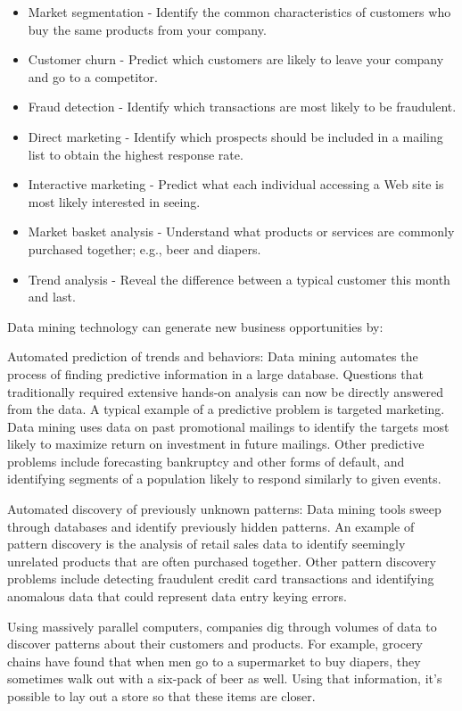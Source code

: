 \documentclass[12pt]{article}
\begin{document}
\begin{itemize}
\item Market segmentation - Identify the common characteristics of customers who buy the same products from your company.
\item Customer churn - Predict which customers are likely to leave your company and go to a competitor.
\item Fraud detection - Identify which transactions are most likely to be fraudulent.
\item Direct marketing - Identify which prospects should be included in a mailing list to obtain the highest response rate.
\item Interactive marketing - Predict what each individual accessing a Web site is most likely interested in seeing.
\item Market basket analysis - Understand what products or services are commonly purchased together; e.g., beer and diapers.
\item Trend analysis - Reveal the difference between a typical customer this month and last.
\end{itemize}
Data mining technology can generate new business opportunities by:

Automated prediction of trends and behaviors: Data mining automates the process of finding predictive information in a large database. Questions that traditionally required extensive hands-on analysis can now be directly answered from the data. A typical example of a predictive problem is targeted marketing. Data mining uses data on past promotional mailings to identify the targets most likely to maximize return on investment in future mailings. Other predictive problems include forecasting bankruptcy and other forms of default, and identifying segments of a population likely to respond similarly to given events.

Automated discovery of previously unknown patterns: Data mining tools sweep through databases and identify previously hidden patterns. An example of pattern discovery is the analysis of retail sales data to identify seemingly unrelated products that are often purchased together. Other pattern discovery problems include detecting fraudulent credit card transactions and identifying anomalous data that could represent data entry keying errors.

Using massively parallel computers, companies dig through volumes of data to discover patterns about their customers and products. For example, grocery chains have found that when men go to a supermarket to buy diapers, they sometimes walk out with a six-pack of beer as well. Using that information, it's possible to lay out a store so that these items are closer.
\end{document}
